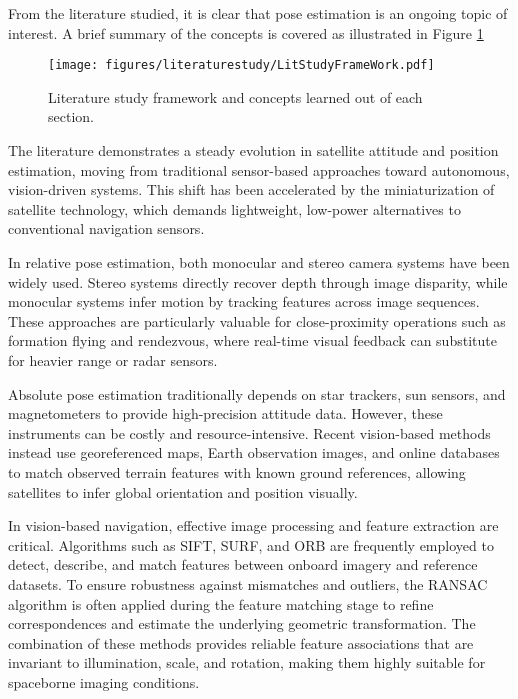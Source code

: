From the literature studied, it is clear that pose estimation is an ongoing topic of interest. A brief summary of the concepts is covered as illustrated in Figure \ref{fig:Litrature study}

\begin{figure}[H]
    \centering
    \texttt{[image: figures/literaturestudy/LitStudyFrameWork.pdf]}
    \caption{Literature study framework and concepts learned out of each section.}
    \label{fig:Litrature study}
\end{figure}

\noindent
The literature demonstrates a steady evolution in satellite attitude and position estimation, moving from traditional sensor-based approaches toward autonomous, vision-driven systems. This shift has been accelerated by the miniaturization of satellite technology, which demands lightweight, low-power alternatives to conventional navigation sensors.
\vspace{0.5cm}

\noindent
In relative pose estimation, both monocular and stereo camera systems have been widely used. Stereo systems directly recover depth through image disparity, while monocular systems infer motion by tracking features across image sequences. These approaches are particularly valuable for close-proximity operations such as formation flying and rendezvous, where real-time visual feedback can substitute for heavier range or radar sensors.
\vspace{0.5cm}

\noindent
Absolute pose estimation traditionally depends on star trackers, sun sensors, and magnetometers to provide high-precision attitude data. However, these instruments can be costly and resource-intensive. Recent vision-based methods instead use georeferenced maps, Earth observation images, and online databases to match observed terrain features with known ground references, allowing satellites to infer global orientation and position visually.
\vspace{0.5cm}

\noindent
In vision-based navigation, effective image processing and feature extraction are critical. Algorithms such as SIFT, SURF, and ORB are frequently employed to detect, describe, and match features between onboard imagery and reference datasets. To ensure robustness against mismatches and outliers, the RANSAC algorithm is often applied during the feature matching stage to refine correspondences and estimate the underlying geometric transformation. The combination of these methods provides reliable feature associations that are invariant to illumination, scale, and rotation, making them highly suitable for spaceborne imaging conditions.
\vspace{0.5cm}

